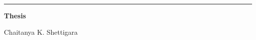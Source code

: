


\begin{titlepage}
\begin{flushleft}
\hrule
\vspace{1 cm}
{\huge{\bf{Thesis}}}


\vspace*{2cm}\vspace{3 cm}
{\large Chaitanya K. Shettigara}

\vspace{0.5 cm}{\today}
\end{flushleft}
\end{titlepage}

\newpage {}
\tableofcontents

\newpage {}


















%

 